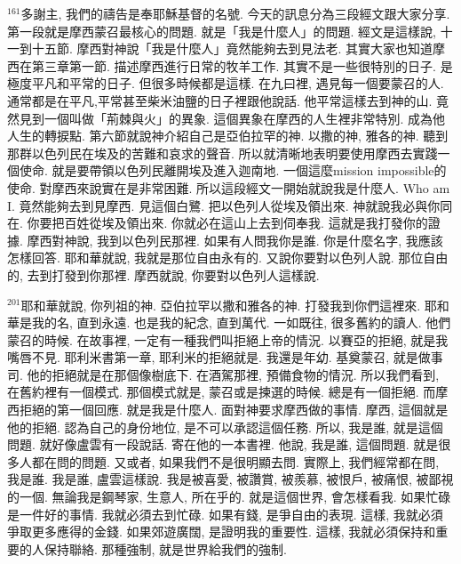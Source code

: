 \documentclass{book}
\begin{document}
$^{161}$多謝主, 我們的禱告是奉耶穌基督的名號.
今天的訊息分為三段經文跟大家分享.
第一段就是摩西蒙召最核心的問題.
就是「我是什麼人」的問題.
經文是這樣說, 十一到十五節.
摩西對神說「我是什麼人」竟然能夠去到見法老.
其實大家也知道摩西在第三章第一節.
描述摩西進行日常的牧羊工作.
其實不是一些很特別的日子.
是極度平凡和平常的日子.
但很多時候都是這樣.
在九曰裡, 遇見每一個要蒙召的人.
通常都是在平凡,平常甚至柴米油鹽的日子裡跟他說話.
他平常這樣去到神的山.
竟然見到一個叫做「荊棘與火」的異象.
這個異象在摩西的人生裡非常特別.
成為他人生的轉捩點.
第六節就說神介紹自己是亞伯拉罕的神.
以撒的神, 雅各的神.
聽到那群以色列民在埃及的苦難和哀求的聲音.
所以就清晰地表明要使用摩西去實踐一個使命.
就是要帶領以色列民離開埃及進入迦南地.
一個這麼mission impossible的使命.
對摩西來說實在是非常困難.
所以這段經文一開始就說我是什麼人.
Who am I.
竟然能夠去到見摩西.
見這個白鷺.
把以色列人從埃及領出來.
神就說我必與你同在.
你要把百姓從埃及領出來.
你就必在這山上去到伺奉我.
這就是我打發你的證據.
摩西對神說, 我到以色列民那裡.
如果有人問我你是誰.
你是什麼名字, 我應該怎樣回答.
耶和華就說, 我就是那位自由永有的.
又說你要對以色列人說.
那位自由的, 去到打發到你那裡.
摩西就說, 你要對以色列人這樣說.

$^{201}$耶和華就說, 你列祖的神.
亞伯拉罕以撒和雅各的神.
打發我到你們這裡來.
耶和華是我的名, 直到永遠.
也是我的紀念, 直到萬代.
一如既往, 很多舊約的讀人.
他們蒙召的時候.
在故事裡, 一定有一種我們叫拒絕上帝的情況.
以賽亞的拒絕, 就是我嘴唇不見.
耶利米書第一章, 耶利米的拒絕就是.
我還是年幼.
基奠蒙召, 就是做事司.
他的拒絕就是在那個像樹底下.
在酒駕那裡, 預備食物的情況.
所以我們看到, 在舊約裡有一個模式.
那個模式就是, 蒙召或是揀選的時候.
總是有一個拒絕.
而摩西拒絕的第一個回應.
就是我是什麼人.
面對神要求摩西做的事情.
摩西, 這個就是他的拒絕.
認為自己的身份地位, 是不可以承認這個任務.
所以, 我是誰, 就是這個問題.
就好像盧雲有一段說話.
寄在他的一本書裡.
他說, 我是誰, 這個問題.
就是很多人都在問的問題.
又或者, 如果我們不是很明顯去問.
實際上, 我們經常都在問, 我是誰.
我是誰, 盧雲這樣說.
我是被喜愛, 被讚賞, 被羨慕, 被恨戶, 被痛恨, 被鄙視的一個.
無論我是鋼琴家, 生意人, 所在乎的.
就是這個世界, 會怎樣看我.
如果忙碌是一件好的事情.
我就必須去到忙碌.
如果有錢, 是爭自由的表現.
這樣, 我就必須爭取更多應得的金錢.
如果郊遊廣闊, 是證明我的重要性.
這樣, 我就必須保持和重要的人保持聯絡.
那種強制, 就是世界給我們的強制.
\end{document}

